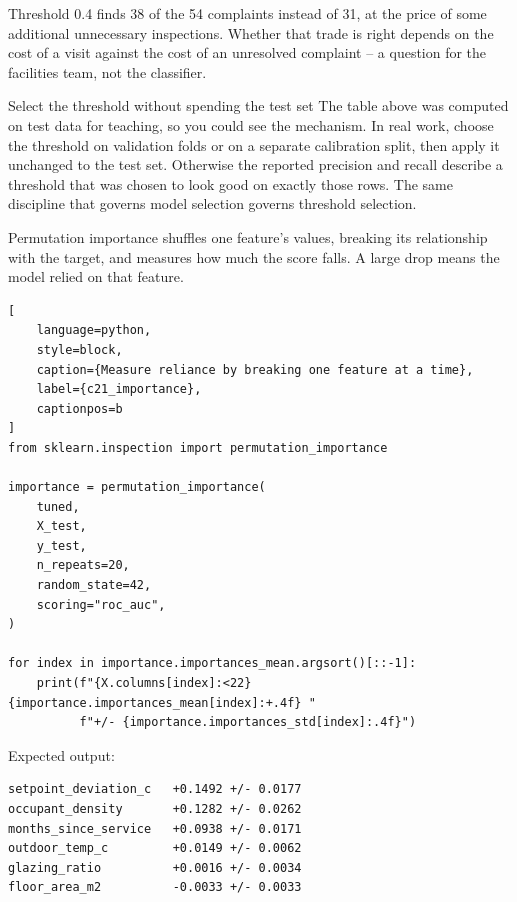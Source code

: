 Threshold 0.4 finds 38 of the 54 complaints instead of 31, at the price of some
additional unnecessary inspections. Whether that trade is right depends on the
cost of a visit against the cost of an unresolved complaint -- a question for the
facilities team, not the classifier.

\begin{ExplainBox}{Select the threshold without spending the test set}
The table above was computed on test data for teaching, so you could see the
mechanism. In real work, choose the threshold on validation folds or on a
separate calibration split, then apply it unchanged to the test set. Otherwise
the reported precision and recall describe a threshold that was chosen to look
good on exactly those rows. The same discipline that governs model selection
governs threshold selection.
\end{ExplainBox}

\label{sec:c21-importance}

Permutation importance shuffles one feature's values, breaking its relationship
with the target, and measures how much the score falls. A large drop means the
model relied on that feature.

\begin{lstlisting}[
    language=python,
    style=block,
    caption={Measure reliance by breaking one feature at a time},
    label={c21_importance},
    captionpos=b
]
from sklearn.inspection import permutation_importance

importance = permutation_importance(
    tuned,
    X_test,
    y_test,
    n_repeats=20,
    random_state=42,
    scoring="roc_auc",
)

for index in importance.importances_mean.argsort()[::-1]:
    print(f"{X.columns[index]:<22} {importance.importances_mean[index]:+.4f} "
          f"+/- {importance.importances_std[index]:.4f}")
\end{lstlisting}

Expected output:

\begin{lstlisting}[language=text, style=block, caption={Measured reliance, ranked}, label={c21_importance_output}, captionpos=b]
setpoint_deviation_c   +0.1492 +/- 0.0177
occupant_density       +0.1282 +/- 0.0262
months_since_service   +0.0938 +/- 0.0171
outdoor_temp_c         +0.0149 +/- 0.0062
glazing_ratio          +0.0016 +/- 0.0034
floor_area_m2          -0.0033 +/- 0.0033
\end{lstlisting}

